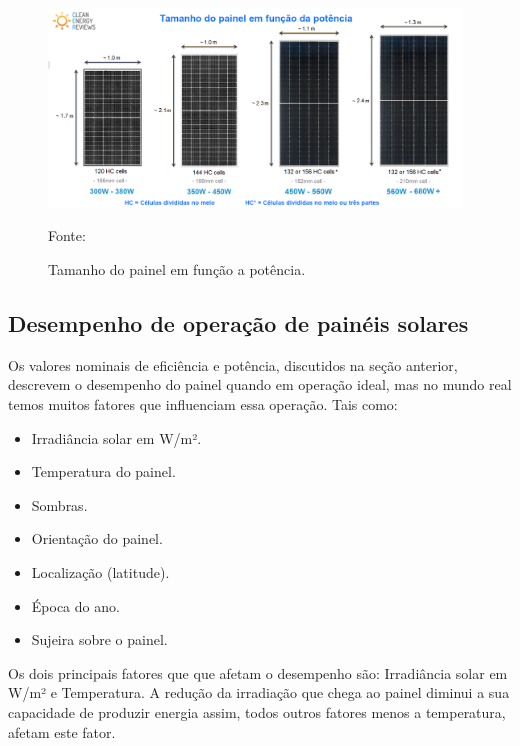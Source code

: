 \begin{figure}[H]
    \centering
    \includegraphics[width=0.975\textwidth]{./Figuras/pv_size.png}
    \caption{Tamanho do painel em função a potência.}{Fonte: \cite{cleanenergyreviews}}
   \label{fig:pv_size}
\end{figure}

\subsection{Desempenho de operação de painéis solares} \label{perf_op_pv}

Os valores nominais de eficiência e potência, discutidos na seção anterior, descrevem o desempenho do painel quando em operação ideal, mas no mundo real temos muitos fatores que influenciam essa operação. Tais como:

\begin{itemize}
  \item Irradiância solar em W/m².

  \item Temperatura do painel.
  
  \item Sombras.
  
  \item Orientação do painel.
  
  \item Localização (latitude).
  
  \item Época do ano.
  
  \item Sujeira sobre o painel.
\end{itemize}

Os dois principais fatores que que afetam o desempenho são: Irradiância solar em W/m² e Temperatura. A redução da irradiação que chega ao painel diminui a sua capacidade de produzir energia assim, todos outros fatores menos a temperatura, afetam este fator.

